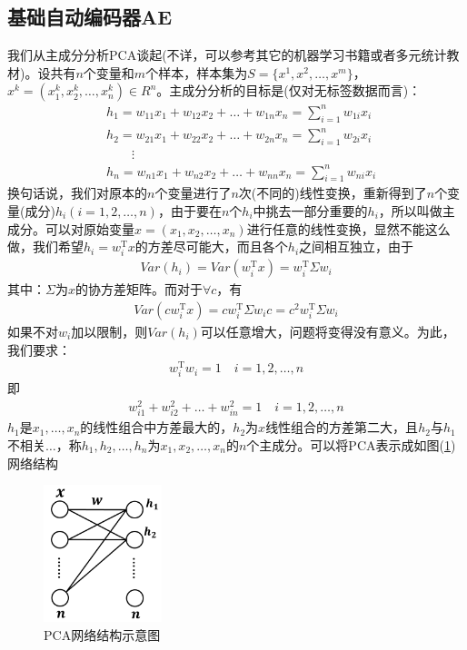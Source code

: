     \subsection{基础自动编码器AE}
        \par
        我们从主成分分析PCA谈起(不详，可以参考其它的机器学习书籍或者多元统计教材)。设共有$n$个变量和$m$个样本，样本集为$S=\{x^1,x^2,\dots,x^m\}$，$x^k = (x_1^k,x_2^k,\dots,x_n^k)\in R^n$。主成分分析的目标是(仅对无标签数据而言)：
        \begin{align*}
        & h_1 = w_{11}x_1 + w_{12}x_ 2+ \dots + w_{1n}x_n = \sum_{i=1}^n w_{1i}x_i\\
        & h_2 = w_{21}x_1 + w_{22}x_ 2+ \dots + w_{2n}x_n = \sum_{i=1}^n w_{2i}x_i\\
        & \qquad \vdots\\
        & h_n = w_{n1}x_1 + w_{n2}x_ 2+ \dots + w_{nn}x_n = \sum_{i=1}^n w_{ni}x_i
        \end{align*}
        换句话说，我们对原本的$n$个变量进行了$n$次(不同的)线性变换，重新得到了$n$个变量(成分)$h_i(i=1,2,\dots,n)$，由于要在$n$个$h_i$中挑去一部分重要的$h_i$，所以叫做主成分。可以对原始变量$x = (x_1,x_2,\dots,x_n)$进行任意的线性变换，显然不能这么做，我们希望$h_i = w_i^\mathrm{T}x$的方差尽可能大，而且各个$h_i$之间相互独立，由于
        \begin{align*}
        Var(h_i) = Var(w_i^\mathrm{T}x) = w_i^\mathrm{T}\Sigma w_i
        \end{align*}
        其中：$\Sigma$为$x$的协方差矩阵。而对于$\forall c$，有
        \begin{align*}
        Var(cw_i^\mathrm{T}x) = cw_i^\mathrm{T}\Sigma w_i c = c^2w_i^\mathrm{T}\Sigma w_i
        \end{align*}
        如果不对$w_i$加以限制，则$Var(h_i)$可以任意增大，问题将变得没有意义。为此，我们要求：
        \begin{align*}
        w_i^\mathrm{T}w_i = 1 \quad i=1,2,\dots,n
        \end{align*}
        即
        \begin{align*}
        w_{i1}^2+w_{i2}^2+\dots+w_{in}^2 = 1 \quad i=1,2,\dots,n
        \end{align*}
        $h_1$是$x_1,\dots,x_n$的线性组合中方差最大的，$h_2$为$x$线性组合的方差第二大，且$h_2$与$h_1$不相关$\dots$，称$h_1,h_2,\dots,h_n$为$x_1,x_2,\dots,x_n$的$n$个主成分。可以将PCA表示成如图(\ref{fig:PCA网络结构示意图})网络结构
            \begin{figure}[H]
            \centering
            \includegraphics[height=4cm]{images/PCA_net_structure.jpg}
            \caption{PCA网络结构示意图}
            \label{fig:PCA网络结构示意图}
            \end{figure}
